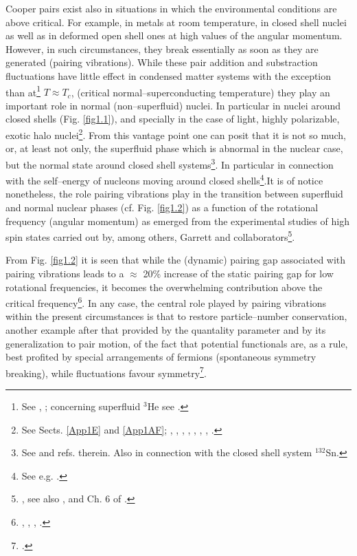  Cooper pairs exist also in situations in which the environmental conditions are above critical. For example, in metals at room temperature, in closed shell nuclei as well as in deformed open shell ones at high values of the angular momentum. However, in such circumstances, they break essentially as soon as they are generated (pairing vibrations). While these pair addition and substraction fluctuations have little effect in condensed matter systems with the exception than at\footnote{See \cite{Schmidt:68}, \cite{Schmid:69} \cite{Abrahams:68}; concerning superfluid $^3$He see \cite{Wolfe:78}.} $T\approx T_c$, (critical normal--superconducting temperature) they play an important role in normal (non--superfluid) nuclei. In particular in nuclei around closed shells (Fig. \ref{fig1.1}), and specially in the case of light, highly polarizable, exotic halo nuclei\footnote{See Sects. \ref{App1E} and \ref{App1AF}; \cite{Bohr:75} , \cite{Bes:66}, \cite{Hogassen:61}, \cite{Schmidt:72}, \cite{Schmidt:68}, \cite{Barranco:01}, \cite{Potel:13}, \cite{Potel:14}.}. From this vantage point one can posit that it is not so much, or, at least not only, the superfluid phase which is abnormal in the nuclear case, but the normal state around closed shell systems\footnote{See \cite{Potel:13} and refs. therein. Also \cite{Potel:13b} in connection with the closed shell system $^{132}$Sn.}. In particular in connection with the self--energy of nucleons moving around closed shells\footnote{See e.g. \cite{Bes:71,Bes:71b,Bes:71c}.}.It is of notice nonetheless, the role pairing vibrations play in the  transition between superfluid and normal nuclear phases (cf. Fig. \ref{fig1.2}) as a function of the rotational frequency (angular momentum) as emerged from the experimental studies of high spin states carried out by, among others, Garrett and collaborators\footnote{\cite{Garrett:85,Garrett:86}, see also \cite{Shimizu:89}, \cite{Barranco:87b} and Ch. 6 of \cite{Brink:05}.}.
 
 
  From Fig. \ref{fig1.2} it is seen that while the (dynamic) pairing gap associated with pairing vibrations leads to a $\approx$ 20\% increase of the static pairing gap for low rotational frequencies, it becomes the overwhelming contribution above the critical frequency\footnote{\cite{Shimizu:89}, \cite{Shimizu:90}, \cite{Shimizu:13},  \cite{Donau:99} \cite{Shimizu:00}.}. In any case, the central role played by pairing vibrations within the present circumstances is that to restore particle--number conservation, another example after that provided by the quantality parameter and by its generalization to pair motion, of the fact that potential functionals are, as a rule, best profited by special arrangements of fermions (spontaneous symmetry breaking), while fluctuations favour symmetry\footnote{\cite{Anderson:84,Anderson:76}.}. 
  
